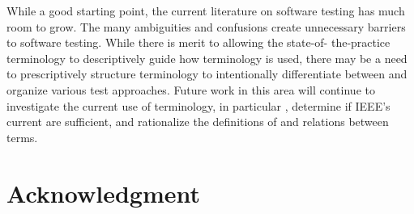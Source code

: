 \documentclass[conference]{IEEEtran}
\begin{document}
While a good starting point, the current literature on software testing has
much room to grow. The many ambiguities and confusions create unnecessary
barriers to software testing. While there is merit to allowing the state-of-%
the-practice terminology to descriptively guide how terminology is used, there
may be a need to prescriptively structure terminology to intentionally
differentiate between and organize various test approaches. Future work in this
area will continue to investigate the current use of terminology, in
particular , determine if IEEE's current
 are sufficient, and rationalize the definitions of
and relations between terms.

\section*{Acknowledgment}


\newpage



\end{document}
